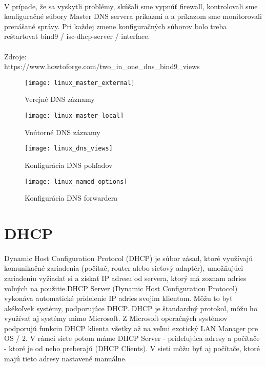 \paragraph{}
V prípade, že sa vyskytli problémy, skúšali sme vypnúť firewall, kontrolovali sme konfiguračné súbory Master DNS servera príkazmi  a  a príkazom  sme monitorovali prenášané správy. Pri každej zmene konfiguračných súborov bolo treba reštartovať bind9 / isc-dhcp-server / interface.
\\
\\
\noindent
Zdroje:\\
\noindent
https://www.howtoforge.com/two\_in\_one\_dns\_bind9\_views\\

\begin{figure}[!htb]
\centering
\texttt{[image: linux\_master\_external]}
\caption{Verejné DNS záznamy}
\label{fig:x dns_external}
\end{figure}

\begin{figure}[!htb]
\centering
\texttt{[image: linux\_master\_local]}
\caption{Vnútorné DNS záznamy}
\label{fig:x dns_internal}
\end{figure}

\begin{figure}[!htb]
\centering
\texttt{[image: linux\_dns\_views]}
\caption{Konfigurácia DNS pohľadov}
\label{fig:x dns_views}
\end{figure}

\begin{figure}[!htb]
\centering
\texttt{[image: linux\_named\_options]}
\caption{Konfigurácia DNS forwardera}
\label{fig:x dns_forwarder}
\end{figure}


\section{DHCP}
\paragraph{}
Dynamic Host Configuration Protocol (DHCP) je súbor zásad, ktoré využívajú komunikačné zariadenia (počítač, router alebo sieťový adaptér), umožňujúci zariadeniu vyžiadať si a získať IP adresu od servera, ktorý má zoznam adries voľných na použitie.DHCP Server (Dynamic Host Configuration Protocol) vykonáva automatické pridelenie IP adries svojim klientom. Môžu to byť akékoľvek systémy, podporujúce DHCP. DHCP je štandardný protokol, môžu ho využívať aj systémy mimo Microsoft. Z Microsoft operačných systémov podporujú funkciu DHCP klienta všetky až na veľmi exotický LAN Manager pre OS / 2. V rámci siete potom máme DHCP Server - prideľujúca adresy a počítače - ktoré je od neho preberajú (DHCP Clients). V sieti môžu byť aj počítače, ktoré majú tieto adresy nastavené manuálne.

